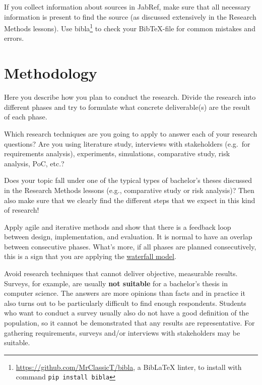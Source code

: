 \documentclass[english]{hogent-article}
\begin{document}
If you collect information about sources in Jab\-Ref, make sure that all necessary information is present to find the source (as discussed extensively in the Research Methods lessons).  Use bibla\footnote{\url{https://github.com/MrClassicT/bibla}, a {Bib\LaTeX} linter, to install with command \texttt{pip install bibla}} to check your Bib\TeX-file for common mistakes and errors.


\section{Methodology}%
\label{sec:methodology}


Here you describe how you plan to conduct the research. Divide the research into different phases and try to formulate what concrete deliverable(s) are the result of each phase.

Which research techniques are you going to apply to answer each of your research questions? Are you using literature study, interviews with stakeholders (e.g.\ for requirements analysis), experiments, simulations, comparative study, risk analysis, PoC, etc.?

Does your topic fall under one of the typical types of bachelor's theses discussed in the Research Methods lessons (e.g., comparative study or risk analysis)? Then also make sure that we clearly find the different steps that we expect in this kind of research!

Apply agile and iterative methods and show that there is a feedback loop between design, implementation, and evaluation. It is normal to have an overlap between consecutive phases. What's more, if all phases are planned consecutively, this is a sign that you are applying the \href{https:/commando/en.wikipedia.org/wiki/Waterfall_model}{waterfall model}.

Avoid research techniques that cannot deliver objective, measurable results. Surveys, for example, are usually \textbf{not suitable} for a bachelor's thesis in computer science. The answers are more opinions than facts and in practice it also turns out to be particularly difficult to find enough respondents. Students who want to conduct a survey usually also do not have a good definition of the population, so it cannot be demonstrated that any results are representative. For gathering requirements, surveys and/or interviews with stakeholders may be suitable.
\end{document}
